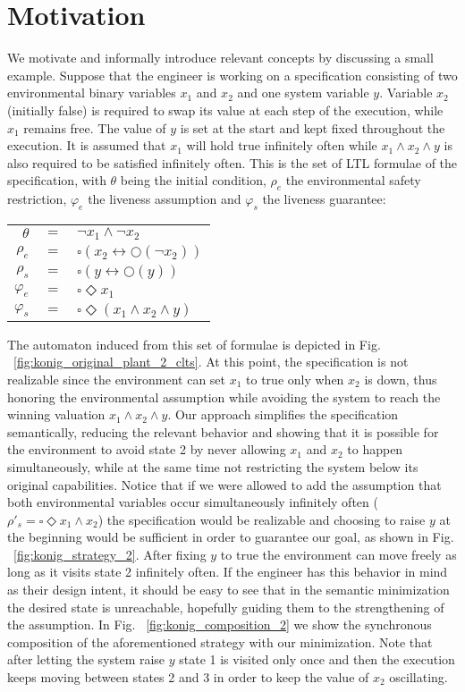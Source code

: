 \section{Motivation}\label{sec:motivation}
We motivate and informally introduce relevant concepts by discussing a small example. Suppose that the engineer is working on a specification consisting of two environmental binary variables $x_1$ and $x_2$ and one system variable $y$. Variable $x_2$ (initially false) is required to swap its value at each step of the execution, while $x_1$ remains free. The value of $y$ is set at the start and kept fixed throughout the execution.
It is assumed that $x_1$ will hold true infinitely often while $x_1 \wedge x_2 \wedge y$ is also required to be satisfied infinitely often. This is the set of LTL formulae of the specification, with $\theta$ being the initial condition, $\rho_e$ the environmental safety restriction, $\varphi_e$ the liveness assumption and $\varphi_s$ the liveness guarantee:
\begin{center}
	\begin{tabular}{ r c l }
		$\theta$& $=$ &$\neg x_1 \wedge \neg x_2$\\
		$\rho_e$& $=$ &$\square(x_2 \leftrightarrow \bigcirc(\neg x_2))$\\
		$\rho_s$& $=$ &$\square(y \leftrightarrow \bigcirc(y))$\\		
		$\varphi_e$& $=$ &$\square \Diamond x_1$\\
		$\varphi_s$& $=$ &$\square \Diamond (x_1 \wedge x_2 \wedge y)$\\
	\end{tabular}
\end{center}
The automaton induced from this set of formulae is depicted in Fig. ~\ref{fig:konig_original_plant_2_clts}. At this point, the specification is not realizable since the environment can set $x_1$ to true only when $x_2$ is down, thus honoring the environmental assumption while avoiding the system to reach the winning valuation $x_1 \wedge x_2 \wedge y$.  
Our approach simplifies the specification semantically, reducing the relevant behavior and showing that it is possible for the environment to avoid state 2 by never allowing $x_1$ and $x_2$ to happen simultaneously, while at the same time not restricting the system below its original capabilities.
 Notice that if we were allowed to add the assumption that both environmental variables occur simultaneously infinitely often ($\rho'_s = \square \Diamond x_1 \wedge x_2$) the specification would be realizable and choosing to raise $y$ at the beginning would be sufficient in order to guarantee our goal, as shown in Fig. ~\ref{fig:konig_strategy_2}. After fixing $y$ to true the environment can move freely as long as it visits state 2 infinitely often. If the engineer has this behavior in mind as their design intent, it should be easy to see that in the semantic minimization the desired state is unreachable, hopefully guiding them to the strengthening of the assumption.  In Fig. ~\ref{fig:konig_composition_2} we show the synchronous composition of the aforementioned strategy with our minimization. Note that after letting the system raise $y$ state 1 is visited only once and then the execution keeps moving between states 2 and 3 in order to keep the value of $x_2$ oscillating.
